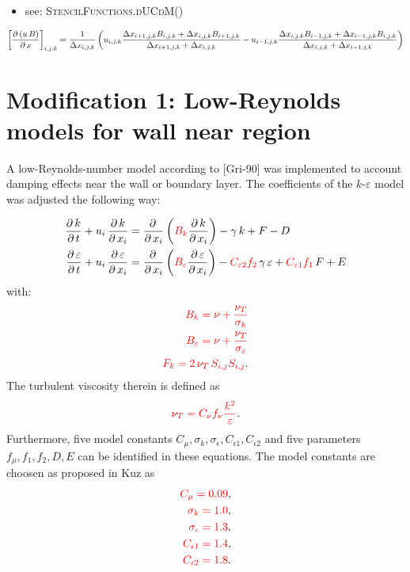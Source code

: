 \begin{itemize}
\item see: \textsc{StencilFunctions.dUCdM()}
\end{itemize}

\begin{align*}
\left[\frac{\partial\,(u\,B)}{\partial\,x}\right]_{i,j,k}
= 
\frac{1}{\Delta x_{i,j,k}}\left(
u_{i,j,k}\frac{\Delta x_{i+1,j,k}B_{i,j,k}+\Delta x_{i,j,k}B_{i+1,j,k}}{\Delta x_{i+1,j,k}+\Delta x_{i,j,k}}
-
u_{i-1,j,k}\frac{\Delta x_{i,j,k}B_{i-1,j,k}+\Delta x_{i-1,j,k}B_{i,j,k}}{\Delta x_{i,j,k}+\Delta x_{i-1,j,k}}
\right)
\end{align*}


\section{Modification 1: Low-Reynolds models for wall near region} %
\label{sec:modification_1_low_reynolds_models_for_wall_near_region}

A low-Reynolds-number model according to [Gri-90] was implemented to account damping effects near the wall or boundary layer. The coefficients of the $k$-$\varepsilon$ model was adjusted the following way:

\begin{align}
\frac{\partial\,k}{\partial\,t} + u_i\,\frac{\partial\,k}{\partial\,x_i}
&=
\frac{\partial\,}{\partial\,x_i}\left(  \textcolor{red}{B_k} \frac{\partial\,k}{\partial\,x_i} \right) 
-
\gamma \, k
+
F
-
D
\\
\frac{\partial\,\varepsilon}{\partial\,t} + u_i\,\frac{\partial\,\varepsilon}{\partial\,x_i}
&=
\frac{\partial\,}{\partial\,x_i}\left( \textcolor{red}{B_\varepsilon} \frac{\partial\,\varepsilon}{\partial\,x_i} \right) 
-
\textcolor{red}{C_{\varepsilon 2} f_2}\,\gamma \, \varepsilon
+
\textcolor{red}{C_{\varepsilon 1} f_1}\,F
+
E
\end{align}
with:
\begin{align}
\textcolor{red}{B_k = \nu + \frac{\nu_T}{\sigma_k}} \\
\textcolor{red}{B_\varepsilon = \nu + \frac{\nu_T}{\sigma_{\varepsilon}}} \\
\textcolor{red}{F_k = 2\,\nu_T\,S_{i,j}S_{i,j}}.
\end{align}
The turbulent viscosity therein is defined as
\begin{align}
	\textcolor{red}{ \nu_T = C_\nu f_\nu \frac{k^2}{\varepsilon} }.
\end{align}
Furthermore, five model constants $C_{\mu}, \sigma_k, \sigma_{\epsilon}, C_{\epsilon 1}, C_{\epsilon 2}$ and five parameters $f_{\mu}, f_1, f_2, D, E$ can be identified in these equations. The model constants are choosen as proposed in Kuz as
\begin{align}
    \textcolor{red}{C_{\mu} = 0.09} , \\
    \textcolor{red}{\sigma_k = 1.0} , \\
    \textcolor{red}{\sigma_{\epsilon} = 1.3} , \\
    \textcolor{red}{C_{\epsilon 1} = 1.4} , \\
    \textcolor{red}{C_{\epsilon 2} = 1.8} .	
\end{align}


